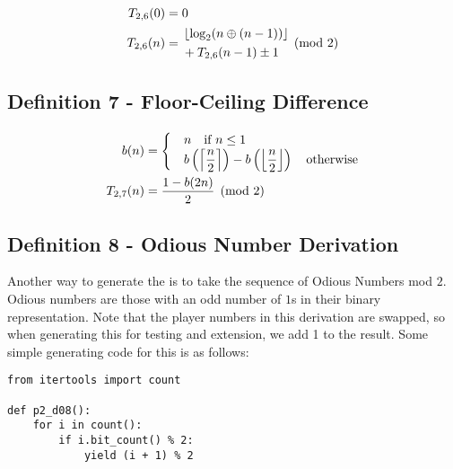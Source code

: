 \documentclass[conference]{IEEEtran}
\begin{document}
\begin{equation}
    \label{eq:p2d06}
    \begin{aligned}
T_{2,6}(0) &= 0 \\
T_{2,6}(n) &= \begin{aligned}[c]
    &\floor{\log_2(n \oplus (n - 1))} \\
    &+ T_{2,6}(n - 1) \pm 1
\end{aligned} \pmod{2}
    \end{aligned}
\end{equation}

\subsection{Definition 7 - Floor-Ceiling Difference}


\begin{equation}
    \label{eq:p2d07}
    \begin{aligned}
      b(n) &= \begin{cases}
          &n \quad \text{if } n \le 1 \\
          &b\left(\ceil{\dfrac{n}{2}}\right) - b\left(\floor{\dfrac{n}{2}}\right) \quad \text{otherwise}
\end{cases} \\
T_{2,7}(n) &= \dfrac{1 - b(2n)}{2} \pmod{2}
    \end{aligned}
\end{equation}


\subsection{Definition 8 - Odious Number Derivation}


Another way to generate the \TMS is to take the sequence of Odious Numbers \cite{OEIS-Odious} mod $2$. Odious numbers are those with an odd number of $1$s in their binary representation. Note that the player numbers in this derivation are swapped, so when generating this for testing and extension, we add 1 to the result. Some simple generating code \cite{repo} for this is as follows:

\begin{lstlisting}[style=pythonstyle]
from itertools import count

def p2_d08():
    for i in count():
        if i.bit_count() % 2:
            yield (i + 1) % 2
\end{lstlisting}
\end{document}
